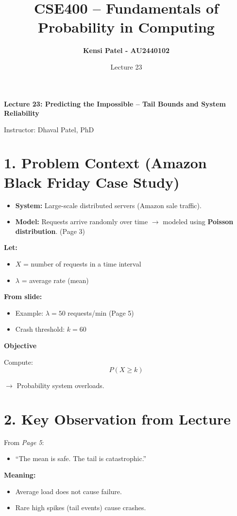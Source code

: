\documentclass{article}
\title{\textbf{CSE400 – Fundamentals of Probability in Computing}}
\author{\textbf{Kensi Patel - AU2440102}}
\date{Lecture 23}
\begin{document}
\maketitle

\textbf{Lecture 23: Predicting the Impossible – Tail Bounds and System Reliability}

Instructor: Dhaval Patel, PhD

\section*{1. Problem Context (Amazon Black Friday Case Study)}

\begin{itemize}
    \item \textbf{System:} Large-scale distributed servers (Amazon sale traffic).
    \item \textbf{Model:} Requests arrive randomly over time $\rightarrow$ modeled using \textbf{Poisson distribution}. (Page 3)
\end{itemize}

\textbf{Let:}
\begin{itemize}
    \item $X$ = number of requests in a time interval
    \item $\lambda$ = average rate (mean)
\end{itemize}

\textbf{From slide:}
\begin{itemize}
    \item Example: $\lambda = 50$ requests/min (Page 5)
    \item Crash threshold: $k = 60$
\end{itemize}

\textbf{Objective}

Compute:
\[P(X \ge k)\]

$\rightarrow$ Probability system overloads.

\section*{2. Key Observation from Lecture}

From \textit{Page 5}:
\begin{itemize}
    \item ``The mean is safe. The tail is catastrophic.''
\end{itemize}

\textbf{Meaning:}
\begin{itemize}
    \item Average load does not cause failure.
    \item Rare high spikes (tail events) cause crashes.
\end{itemize}
\end{document}
